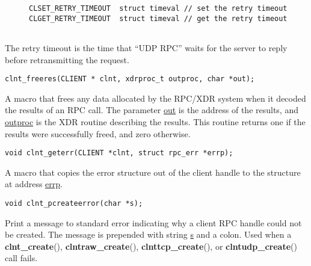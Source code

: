 \documentclass[]{article}
\let\realtextbf=\textbf
\renewcommand{\textbf}[1]{\textcolor{boldcolor}{\realtextbf{#1}}}
\renewcommand{\emph}[1]{\underline{#1}}
\begin{document}
\begin{description}
\item[]
\begin{verbatim}
CLSET_RETRY_TIMEOUT  struct timeval // set the retry timeout
CLGET_RETRY_TIMEOUT  struct timeval // get the retry timeout
    
\end{verbatim}
\end{description}

\begin{description}
\itemsep1pt\parskip0pt
\item[]
The retry timeout is the time that ``UDP RPC'' waits for the server to
reply before retransmitting the request.
\end{description}

\begin{verbatim}
clnt_freeres(CLIENT * clnt, xdrproc_t outproc, char *out);
\end{verbatim}

\begin{description}
\itemsep1pt\parskip0pt
\item[]
A macro that frees any data allocated by the RPC/XDR system when it
decoded the results of an RPC call. The parameter \emph{out} is the
address of the results, and \emph{outproc} is the XDR routine describing
the results. This routine returns one if the results were successfully
freed, and zero otherwise.
\end{description}

\begin{verbatim}
void clnt_geterr(CLIENT *clnt, struct rpc_err *errp);
\end{verbatim}

\begin{description}
\itemsep1pt\parskip0pt
\item[]
A macro that copies the error structure out of the client handle to the
structure at address \emph{errp}.
\end{description}

\begin{verbatim}
void clnt_pcreateerror(char *s);
\end{verbatim}

\begin{description}
\itemsep1pt\parskip0pt
\item[]
Print a message to standard error indicating why a client RPC handle
could not be created. The message is prepended with string \emph{s} and
a colon. Used when a \textbf{clnt\_create}(),
\textbf{clntraw\_create}(), \textbf{clnttcp\_create}(), or
\textbf{clntudp\_create}() call fails.
\end{description}
\end{document}
